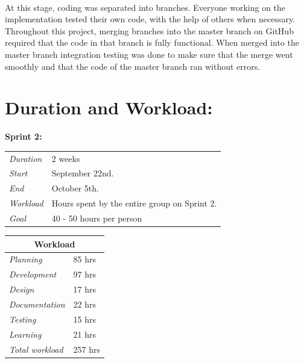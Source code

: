 \paragraph{} At this stage, coding was separated into branches. Everyone working on the implementation tested their own code, with the help of others when necessary. Throughout this project, merging branches into the master branch on GitHub required that the code in that branch is fully functional. When merged into the master branch integration testing was done to make sure that the merge went smoothly and that the code of the master branch ran without errors.

\section{Duration and Workload:}
\label{sec:S2Duration}
\begin{minipage}{\linewidth}
\centering
\setlength{\tabcolsep}{22pt}
\textbf{Sprint 2:} 
\smallskip
{}
\begin{tabular}{ |l l| }
	\hline
	\it{Duration} & 2 weeks \\
	\it{Start} & September 22nd. \\
	\it{End} & October 5th. \\
	\it{Workload} & Hours spent by the entire group on Sprint 2. \\
	\it{Goal} & 40 - 50 hours per person \\
	\hline
\end{tabular}
\end{minipage}
%
\bigskip
%
\begin{minipage}{\linewidth}
\setlength{\tabcolsep}{25pt}
\centering
{}
\begin{tabular}{ |l|l| }
	\hline
	\multicolumn{2}{|c|}{\cellcolor{gray!25} Workload} \\
	\hline
	\it{Planning} & 85 hrs\\
	\it{Development} & 97 hrs \\
	\it{Design} & 17 hrs \\
	\it{Documentation} & 22 hrs \\
	\it{Testing} & 15 hrs \\
	\it{Learning} & 21 hrs \\
	\hline
	\it{Total workload} & 257 hrs \\
	\hline
\end{tabular}
\end{minipage}


